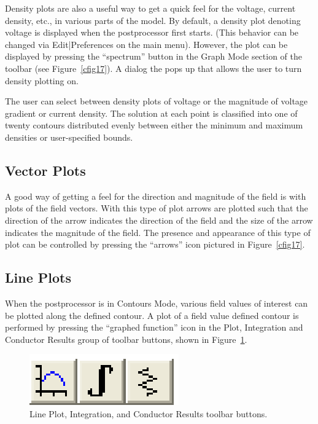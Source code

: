 Density plots are also a useful way to get a quick feel for the
voltage, current density, etc., in various parts of the model. By default,
a density plot denoting voltage is displayed when the postprocessor first starts.
(This behavior can be changed via Edit|Preferences on the main menu).
However, the plot can be displayed by pressing the ``spectrum'' button in
the Graph Mode section of the toolbar (see Figure~\ref{cfig17}). A
dialog the pops up that allows the user to turn density plotting
on.

The user can select between density plots of voltage or the magnitude of
voltage gradient or current density. The solution at each
point is classified into one of twenty contours distributed evenly between
either the minimum and maximum densities or user-specified bounds.

\subsection{Vector Plots}

A good way of getting a feel for the direction and magnitude of the
field is with plots of the field vectors. With this type of plot
arrows are plotted such that the direction of the arrow indicates
the direction of the field and the size of the arrow indicates the
magnitude of the field. The presence and appearance of this type of
plot can be controlled by pressing the ``arrows'' icon pictured in
Figure~\ref{cfig17}.

\subsection{Line Plots}

When the postprocessor is in Contours Mode, various field values of
interest can be plotted along the defined contour. A plot of a
field value defined contour is performed by pressing the ``graphed
function'' icon in the Plot, Integration and Conductor Results group of toolbar
buttons, shown in Figure~\ref{cfig18}.

\begin{figure}[htbp]
\centerline{\includegraphics{cd8.ps}}
\caption{Line Plot, Integration, and Conductor Results toolbar buttons.}
\label{cfig18}
\end{figure}


